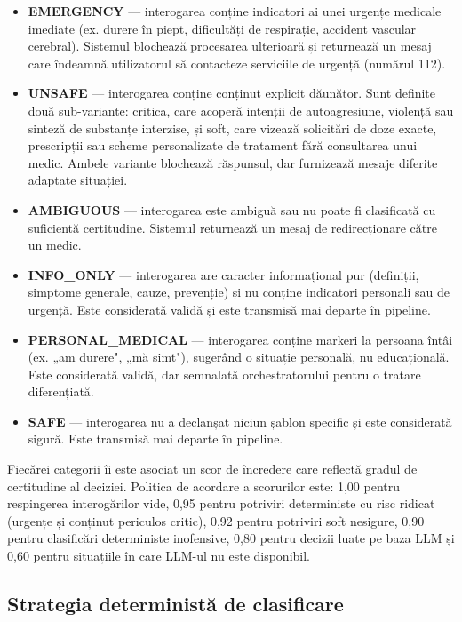 \documentclass[12pt, a4paper, oneside, romanian]{teza-upb}
\begin{document}
\begin{itemize}
    \item \textbf{EMERGENCY} — interogarea conține indicatori ai unei urgențe medicale imediate (ex. durere în piept, dificultăți de respirație, accident vascular cerebral). Sistemul blochează procesarea ulterioară și returnează un mesaj care îndeamnă utilizatorul să contacteze serviciile de urgență (numărul 112).
    \item \textbf{UNSAFE} — interogarea conține conținut explicit dăunător. Sunt definite două sub-variante: critica, care acoperă intenții de autoagresiune, violență sau sinteză de substanțe interzise, și soft, care vizează solicitări de doze exacte, prescripții sau scheme personalizate de tratament fără consultarea unui medic. Ambele variante blochează răspunsul, dar furnizează mesaje diferite adaptate situației.
    \item \textbf{AMBIGUOUS} — interogarea este ambiguă sau nu poate fi clasificată cu suficientă certitudine. Sistemul returnează un mesaj de redirecționare către un medic.
    \item \textbf{INFO\_ONLY} — interogarea are caracter informațional pur (definiții, simptome generale, cauze, prevenție) și nu conține indicatori personali sau de urgență. Este considerată validă și este transmisă mai departe în pipeline.
    \item \textbf{PERSONAL\_MEDICAL} — interogarea conține markeri la persoana întâi (ex. „am durere", „mă simt"), sugerând o situație personală, nu educațională. Este considerată validă, dar semnalată orchestratorului pentru o tratare diferențiată.
    \item \textbf{SAFE} — interogarea nu a declanșat niciun șablon specific și este considerată sigură. Este transmisă mai departe în pipeline.
\end{itemize}

Fiecărei categorii îi este asociat un scor de încredere care reflectă gradul de certitudine al deciziei. Politica de acordare a scorurilor este: 1,00 pentru respingerea interogărilor vide, 0,95 pentru potriviri deterministe cu risc ridicat (urgențe și conținut periculos critic), 0,92 pentru potriviri soft nesigure, 0,90 pentru clasificări deterministe inofensive, 0,80 pentru decizii luate pe baza LLM și 0,60 pentru situațiile în care LLM-ul nu este disponibil.

\subsection{Strategia deterministă de clasificare}
\end{document}
